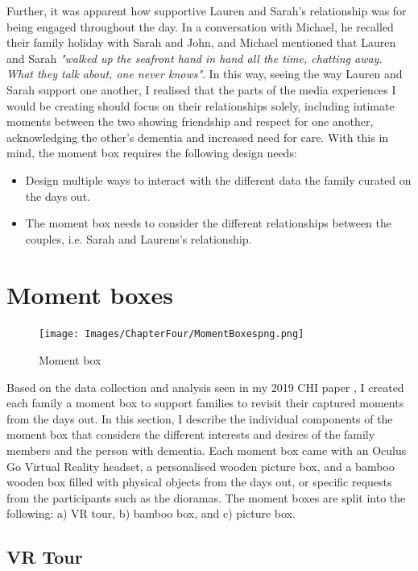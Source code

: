 Further, it was apparent how supportive Lauren and Sarah's relationship was for being engaged throughout the day. In a conversation with Michael, he recalled their family holiday with Sarah and John, and Michael mentioned that Lauren and Sarah \textit{"walked up the seafront hand in hand all the time, chatting away. What they talk about, one never knows"}. In this way, seeing the way Lauren and Sarah support one another, I realised that the parts of the media experiences I would be creating should focus on their relationships solely, including intimate moments between the two showing friendship and respect for one another, acknowledging the other's dementia and increased need for care. With this in mind, the moment box requires the following design needs:

\begin{itemize}
    \item Design multiple ways to interact with the different data the family curated on the days out.
    \item The moment box needs to consider the different relationships between the couples, i.e. Sarah and Laurens's relationship.
\end{itemize}


\section{Moment boxes}
\label{MomentBoxes}

\begin{figure}[htp]
\centering
\texttt{[image: Images/ChapterFour/MomentBoxespng.png]}
\caption{Moment box}
\label{fig:MomentBoxes}
\end{figure}

Based on the data collection and analysis seen in my 2019 CHI paper \citep{hodge_exploring_2019}, I created each family a moment box to support families to revisit their captured moments from the days out. In this section, I describe the individual components of the moment box that considers the different interests and desires of the family members and the person with dementia. Each moment box came with an Oculus Go Virtual Reality headset, a personalised wooden picture box, and a bamboo wooden box filled with physical objects from the days out, or specific requests from the participants such as the dioramas. The moment boxes are split into the following: a) VR tour, b) bamboo box, and c) picture box.

\subsection{VR Tour}
\label{VRTour}

